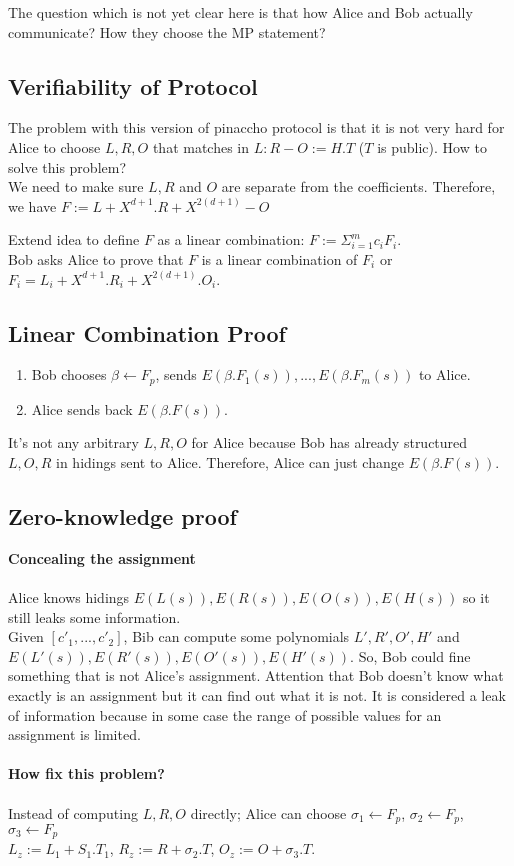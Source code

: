 \documentclass[twoside]{article}
\begin{document}
The question which is not yet clear here is that how Alice and Bob actually communicate? How they choose the MP statement?

\subsection{Verifiability of Protocol}
The problem with this version of pinaccho protocol is that it is not very hard for Alice to choose $L,R, O$ that matches in $L:R-O := H.T$ ($T$ is public). How to solve this problem?
\\ We need to make sure $L, R$ and $O$ are separate from the coefficients. Therefore, we have $F:=L+X^{d+1}.R+X^{2(d+1)}-O$

Extend idea to define $F$ as a linear combination: $F:= \Sigma_{i=1}^m{c_iF_i}$. \\
Bob asks Alice to prove that $F$ is a linear combination of $F_i$ or $F_i=L_i+X^{d+1}.R_i+X^{2(d+1)}.O_i$.

\subsection{Linear Combination Proof}
\begin{enumerate}
	\item Bob chooses $\beta \leftarrow F_p$, sends $E(\beta.F_1(s)),..., E(\beta.F_m(s))$ to Alice.
	
	\item Alice sends back $E(\beta.F(s))$.
\end{enumerate}
It's not any arbitrary $L, R, O$ for Alice because Bob has already structured $L, O, R$ in hidings sent to Alice. Therefore, Alice can just change $E(\beta.F(s))$.

\subsection{Zero-knowledge proof}
\textbf{Concealing the assignment}
\\~\\
Alice knows hidings $E(L(s)), E(R(s)), E(O(s)), E(H(s))$ so it still leaks some information.
\\
Given $[c'_1,...,c'_2]$, Bib can compute some polynomials $L', R', O',H'$  and $E(L'(s)), E(R'(s)), E(O'(s)), E(H'(s))$. So, Bob could fine something that is not Alice's assignment. Attention that Bob doesn't know what exactly is an assignment but it can find out what it is not. It is considered a leak of information because in some case the range of possible values for an assignment is limited.
\\~\\
\textbf{ How fix this problem?} 
\\~\\
Instead of computing $L,R ,O$ directly; Alice can choose $\sigma_1 \leftarrow F_p$, $\sigma_2 \leftarrow F_p$, $\sigma_3 \leftarrow F_p$
\\
$L_z:=L_1+S_1.T_1$, $R_z := R+\sigma_2.T$, $O_z := O+ \sigma_3.T$.



\end{document}

